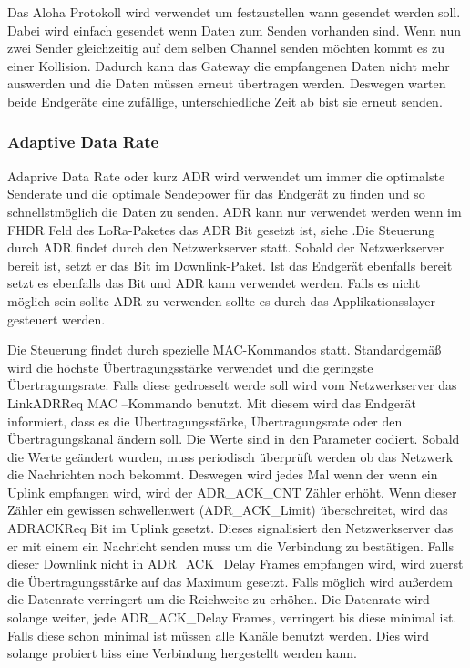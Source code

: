 \documentclass[a4paper,12pt]{article}
\begin{document}
            Das Aloha Protokoll wird verwendet um festzustellen wann gesendet werden soll. Dabei wird einfach gesendet
            wenn Daten zum Senden vorhanden sind. Wenn nun zwei Sender gleichzeitig auf dem selben Channel senden 
            möchten kommt es zu einer Kollision. Dadurch kann das Gateway die empfangenen Daten nicht mehr auswerden 
            und die Daten müssen erneut übertragen werden. Deswegen warten beide Endgeräte eine zufällige, 
            unterschiedliche Zeit ab bist sie erneut senden.
            

            \subsubsection{Adaptive Data Rate}\label{sec:ADR}
            Adaprive Data Rate oder kurz ADR wird verwendet um immer die optimalste Senderate und die optimale 
            Sendepower für das Endgerät zu finden und so schnellstmöglich die Daten zu senden. ADR kann nur 
            verwendet werden wenn im FHDR Feld des LoRa-Paketes das ADR Bit gesetzt ist, siehe 
            .Die Steuerung durch ADR findet durch den Netzwerkserver statt. Sobald der 
            Netzwerkserver bereit ist, setzt er das Bit im Downlink-Paket. Ist das Endgerät ebenfalls bereit 
            setzt es ebenfalls das Bit und ADR kann verwendet werden. Falls es nicht möglich sein sollte ADR zu 
            verwenden sollte es durch das Applikationsslayer gesteuert werden.

            Die Steuerung findet durch spezielle MAC-Kommandos statt. Standardgemäß wird die höchste 
            Übertragungsstärke verwendet und die geringste Übertragungsrate. Falls diese gedrosselt werde soll 
            wird vom Netzwerkserver das LinkADRReq MAC –Kommando benutzt. Mit diesem wird das Endgerät informiert, 
            dass es die Übertragungsstärke, Übertragungsrate oder den Übertragungskanal ändern soll. Die Werte sind 
            in den Parameter codiert. Sobald die Werte geändert wurden, muss periodisch überprüft werden ob das 
            Netzwerk die Nachrichten noch bekommt. Deswegen wird jedes Mal wenn der wenn ein Uplink empfangen wird, 
            wird der ADR\_ACK\_CNT Zähler erhöht. Wenn dieser Zähler ein gewissen schwellenwert (ADR\_ACK\_Limit) 
            überschreitet, wird das ADRACKReq Bit im Uplink gesetzt. Dieses signalisiert den Netzwerkserver das er 
            mit einem ein Nachricht senden muss um die Verbindung zu bestätigen. Falls dieser Downlink nicht in 
            ADR\_ACK\_Delay Frames empfangen wird, wird zuerst die Übertragungsstärke auf das Maximum gesetzt. 
            Falls möglich wird außerdem die Datenrate verringert um die Reichweite zu erhöhen. Die Datenrate wird 
            solange weiter, jede ADR\_ACK\_Delay Frames, verringert bis diese minimal ist. Falls diese schon 
            minimal ist müssen alle Kanäle benutzt werden. Dies wird solange probiert biss eine Verbindung 
            hergestellt werden kann. \cite[S.19 f]{LoRaSpec}         
\end{document}
